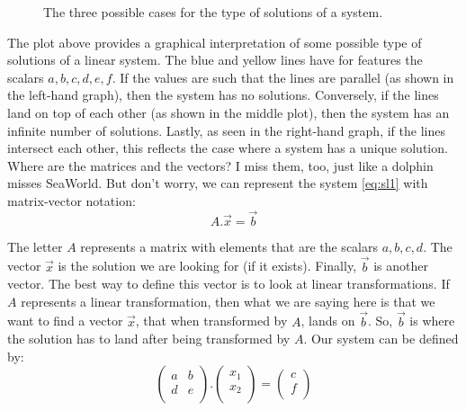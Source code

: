 \documentclass[a4,12pt,twosided,openany]{memoir}
\begin{document}
\begin{figure}[h!]
\begin{center}
\end{center}
\vspace*{2pt}
\caption{The three possible cases for the type of solutions of a system.}
\end{figure}
\par 
\indent
The plot above provides a graphical interpretation of some possible type of solutions of a linear system. The blue and yellow lines have for features the scalars $a,b,c,d,e,f$. If the values are such that the lines are parallel (as shown in the left-hand graph), then the system has no solutions. Conversely, if the lines land on top of each other (as shown in the middle plot), then the system has an infinite number of solutions. Lastly, as seen in the right-hand graph, if the lines intersect each other, this reflects the case where a system has a unique solution. Where are the matrices and the vectors? I miss them, too, just like a dolphin misses SeaWorld. But don’t worry, we  can represent the system \ref{eq:sl1} with matrix-vector notation:
\[A.\overrightarrow{x}  = \overrightarrow{b} \]
\par 
\indent
The letter $A$ represents a matrix with elements that are the scalars $a,b,c,d$. The vector $\overrightarrow{x}$ is the solution we are looking for (if it exists). Finally, $\overrightarrow{b}$ is another vector. The best way to define this vector is to look at linear transformations. If $A$ represents a linear transformation, then what we are saying here is that we want to find a vector $\overrightarrow{x}$, that when transformed by $A$, lands on $\overrightarrow{b}$. So, $\overrightarrow{b}$ is where the solution has to land after being transformed by $A$. Our system can be defined by:
\[ \begin{pmatrix}
a & b \\
d & e\\
\end{pmatrix}. \begin{pmatrix}
x_1\\
x_2\\
\end{pmatrix} = \begin{pmatrix}
c\\
f\\
\end{pmatrix} \]
\end{document}
